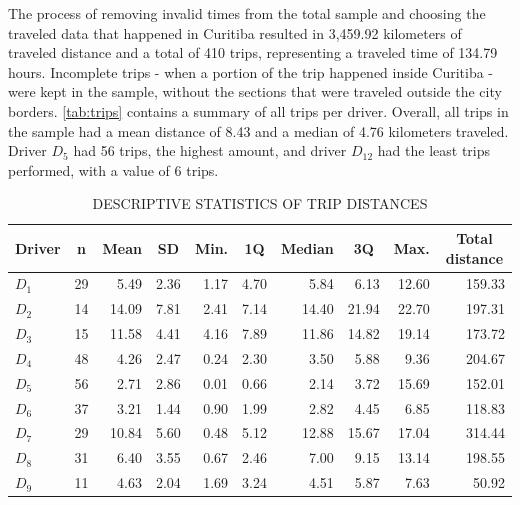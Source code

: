 The process of removing invalid times from the total sample and choosing the traveled data that happened in Curitiba resulted in 3,459.92 kilometers of traveled distance and a total of 410 trips, representing a traveled time of 134.79 hours. Incomplete trips - when a portion of the trip happened inside Curitiba - were kept in the sample, without the sections that were traveled outside the city borders. \autoref{tab:trips} contains a summary of all trips per driver. Overall, all trips in the sample had a mean distance of 8.43 and a median of 4.76 kilometers traveled. Driver $D_5$ had 56 trips, the highest amount, and driver $D_{12}$ had the least trips performed, with a value of 6 trips.

\begin{table}[!htbp]
    \footnotesize
    \captionsetup{justification=raggedright,
        singlelinecheck=false,
        font=footnotesize}
    \caption{DESCRIPTIVE STATISTICS OF TRIP DISTANCES}
    \centering
    \begin{tabular}{lrrrrrrrrr}
        \hline
        \multicolumn{1}{c}{\textbf{Driver}} & \multicolumn{1}{c}{\textbf{n}} & \multicolumn{1}{c}{\textbf{Mean}} & \multicolumn{1}{c}{\textbf{SD}} & \multicolumn{1}{c}{\textbf{Min.}} & \multicolumn{1}{c}{\textbf{1Q}} & \multicolumn{1}{c}{\textbf{Median}} & \multicolumn{1}{c}{\textbf{3Q}} & \multicolumn{1}{c}{\textbf{Max.}} & \multicolumn{1}{c}{\textbf{Total distance}} \\ 
        \hline
        $D_{1}$ & 29 & 5.49 & 2.36 & 1.17 & 4.70 & 5.84 & 6.13 & 12.60 & 159.33 \\ 
        $D_{2}$ & 14 & 14.09 & 7.81 & 2.41 & 7.14 & 14.40 & 21.94 & 22.70 & 197.31 \\ 
        $D_{3}$ & 15 & 11.58 & 4.41 & 4.16 & 7.89 & 11.86 & 14.82 & 19.14 & 173.72 \\ 
        $D_{4}$ & 48 & 4.26 & 2.47 & 0.24 & 2.30 & 3.50 & 5.88 & 9.36 & 204.67 \\ 
        $D_{5}$ & 56 & 2.71 & 2.86 & 0.01 & 0.66 & 2.14 & 3.72 & 15.69 & 152.01 \\ 
        $D_{6}$ & 37 & 3.21 & 1.44 & 0.90 & 1.99 & 2.82 & 4.45 & 6.85 & 118.83 \\ 
        $D_{7}$ & 29 & 10.84 & 5.60 & 0.48 & 5.12 & 12.88 & 15.67 & 17.04 & 314.44 \\ 
        $D_{8}$ & 31 & 6.40 & 3.55 & 0.67 & 2.46 & 7.00 & 9.15 & 13.14 & 198.55 \\ 
        $D_{9}$ & 11 & 4.63 & 2.04 & 1.69 & 3.24 & 4.51 & 5.87 & 7.63 & 50.92 \\ 

\end{tabular}
\end{table}
